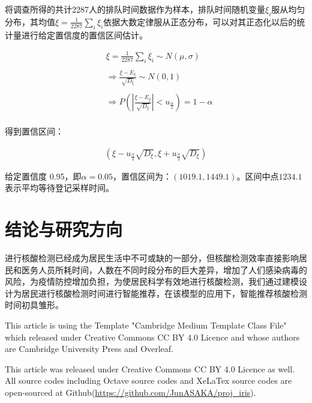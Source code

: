 \documentclass[
  journal=,
  manuscript=,
  year=2022,
  volume=01,
]{cup-journal}
\begin{document}
\par 将调查所得的共计2287人的排队时间数据作为样本，排队时间随机变量$\xi_{i}$服从均匀分布，其均值$\xi=\frac{1}{2287}\sum_{i}\xi_{i}$依据大数定律服从正态分布，可以对其正态化以后的统计量进行给定置信度的置信区间估计。

\begin{equation}
	\begin{aligned}
		& \xi=\frac{1}{2287}\sum_{i}\xi_{i} \sim N \left ( \mu, \sigma \right ) \\ \\
		& \Longrightarrow \frac{\xi-E_{\xi}}{\sqrt{D_{\xi}}} \sim N \left ( 0,1 \right ) \\ \\
		& \Longrightarrow P \left ( \left | \frac{\xi-E_{\xi}}{\sqrt{D_{\xi}}} \right | < u_{\frac{\alpha}{2}} \right ) = 1-\alpha \\
	\end{aligned}
\end{equation}

\par 得到置信区间：

\begin{equation}
	\begin{aligned}
		\left ( \xi - u_{\frac{\alpha}{2}} \sqrt{D_{\xi}} , \xi + u_{\frac{\alpha}{2}} \sqrt{D_{\xi}} \right )
	\end{aligned}
\end{equation}

\par 给定置信度 0.95，即$\alpha=0.05$，置信区间为：$\left ( 1019.1,1449.1 \right )$。区间中点$1234.1$表示平均等待登记采样时间。

\section{结论与研究方向}

\par 进行核酸检测已经成为居民生活中不可或缺的一部分，但核酸检测效率直接影响居民和医务人员所耗时间，人数在不同时段分布的巨大差异，增加了人们感染病毒的风险，为疫情防控增加负担，为使居民科学有效地进行核酸检测，我们通过建模设计为居民进行核酸检测时间进行智能推荐，在该模型的应用下，智能推荐核酸检测时间初具雏形。

\begin{acknowledgement}

	This article is using the Template "Cambridge Medium Template Class File" which released under Creative Commons CC BY 4.0 Licence and whose authors are Cambridge University Press and Overleaf. 

This article was released under Creative Commons CC BY 4.0 Licence as well. All source codes including Octave source codes and XeLaTex source codes are open-sourced at Github(\href{https://github.com/JunASAKA/proj_iris/}{https://github.com/JunASAKA/proj\_iris}). 

\end{acknowledgement}
\end{document}
